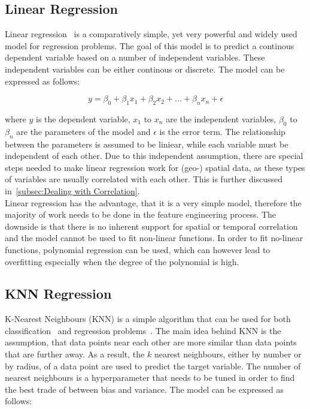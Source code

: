 
\subsection{Linear Regression}
\label{subsec: linear regression}

Linear regression~\cite{montgomery2021introduction} is a comparatively simple, yet very powerful and widely used model for regression problems. The goal of this model is to predict a continous dependent variable based on a number of independent variables. These independent variables can be either continous or discrete. The model can be expressed as follows:

\begin{equation}
    y = \beta_0 + \beta_1 x_1 + \beta_2 x_2 + ... + \beta_n x_n + \epsilon
\end{equation}

where $y$ is the dependent variable, $x_1$ to $x_n$ are the independent variables, $\beta_0$ to $\beta_n$ are the parameters of the model and $\epsilon$ is the error term. The relationship between the parameters is assumed to be liniear, while each variable must be independent of each other. Due to this independent assumption, there are special steps needed to make linear regression work for (geo-) spatial data, as these types of variables are usually correlated with each other. This is further discussed in~\ref{subsec:Dealing with Correlation}.\\
Linear regression has the advantage, that it is a very simple model, therefore the majority of work needs to be done in the feature engineering process. The downside is that there is no inherent support for spatial or temporal correlation and the model cannot be used to fit non-linear functions. In order to fit no-linear functions, polynomial regression can be used, which can however lead to overfitting especially when the degree of the polynomial is high.

\subsection{KNN Regression}

K-Nearest Neighbours (KNN) is a simple algorithm that can be used for both classification~\cite{cover1967nearest} and regression problems~\cite{altman1992introduction}. The main idea behind KNN is the assumption, that data points near each other are more similar than data points that are further away. As a result, the $k$ nearest neighbours, either by number or by radius, of a data point are used to predict the target variable. The number of nearest neighbours is a hyperparameter that needs to be tuned in order to find the best trade of between bias and variance. The model can be expressed as follows:

